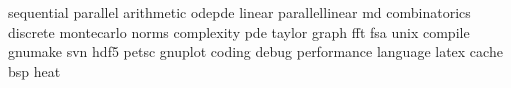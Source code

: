 sequential
parallel
arithmetic
odepde
linear
parallellinear
md
combinatorics
discrete
montecarlo
norms
complexity
pde
taylor
graph
fft
fsa
unix
compile
gnumake
svn
hdf5
petsc
gnuplot
coding
debug
performance
language
latex
cache
bsp
heat
